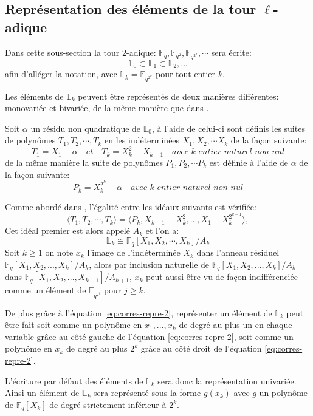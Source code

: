 \documentclass[10pt,a4paper]{book}
\theoremstyle{plain}
\theoremstyle{definition}
\theoremstyle{definition}
\theoremstyle{definition}
\theoremstyle{definition}
\theoremstyle{remark}
\theoremstyle{remark}
\begin{document}
\subsection{Représentation des éléments de la tour $\ell$-adique}%
Dans cette sous-section la tour $2$-adique: $\mathbb{F}_q, \mathbb{F}_{q^2}, \mathbb{F}_{q^{2^2}}, \cdots$ sera écrite:
\[
\mathbb{L}_{0} \subset \mathbb{L}_{1} \subset \mathbb{L}_{2}, ... 
\]
afin d'alléger la notation, avec $\mathbb{L}_{k}=\mathbb{F}_{q^{2^{k}}}$ pour tout entier $k$.


Les éléments de $\mathbb{L}_k$ peuvent être représentés de deux manières différentes: monovariée et bivariée, de la même manière que dans \cite{DeFeo-Shost'12}. 

Soit $\alpha$ un résidu non quadratique de $ \mathbb{L}_0$, à l'aide de celui-ci sont définis les suites de polynômes $T_1,T_2,\cdots, T_k$ en les indéterminées $X_1,X_2, \cdots X_k$ de la façon suivante:
\[
T_1=X_1-\alpha \quad \textit{et} \quad T_k=X_k^2-X_{k-1} \quad \textit{avec $k$ entier naturel non nul}
\]  de la même manière la suite de polynômes $P_1,P_2, \cdots P_k$ est définie à l'aide de $\alpha$ de la façon suivante:
\[
P_k=X_k^{2^k}-\alpha \quad \textit{avec $k$ entier naturel non nul} 
\]

Comme abordé dans \cite{lang2002algebra}, l'égalité entre les idéaux suivants est vérifiée:
\begin{equation}
\label{eq:corres-repre-2}
\langle T_1, T_2, \cdots, T_k \rangle = \langle P_k, X_{k-1}-X_k^2, ..., X_1-X_{k}^{2^{k-1}} \rangle,
\end{equation}
Cet idéal premier est alors appelé $A_k$ et l'on a:
\[
\mathbb{L}_k \cong \mathbb{F}_q[X_1,X_2,\cdots,X_k]/A_k
\]
Soit $k \geqslant 1$  on note $x_k$ l'image de l'indéterminée $X_k$ dans l'anneau résiduel $\mathbb{F}_q[X_1,X_2, ...,X_k]/A_k$, alors par inclusion naturelle de $\mathbb{F}_q[X_1,X_2, ...,X_k]/A_k$ dans $\mathbb{F}_q[X_1,X_2, ...,X_{k+1}]/A_{k+1}$, $x_k$ peut aussi être vu de façon indifférenciée comme un élément de $\mathbb{F}_{q^{2^j}}$ pour $j \geqslant k$.

De plus grâce à l'équation \ref{eq:corres-repre-2}, représenter un élément de $\mathbb{L}_k$ peut être fait soit comme un polynôme en $x_1, ..., x_k$ de degré au plus un en chaque variable grâce au côté gauche de l'équation \ref{eq:corres-repre-2}, soit comme un polynôme en $x_k$ de degré au plus $2^k$ grâce au côté droit de l'équation \ref{eq:corres-repre-2}.

L'écriture par défaut des éléments de $\mathbb{L}_k$ sera donc la représentation univariée. Ainsi un élément de $\mathbb{L}_k$ sera représenté sous la forme $g(x_k)$ avec $g$ un polynôme de $\mathbb{F}_q[X_k]$ de degré strictement inférieur à $2^k$. 
\end{document}

